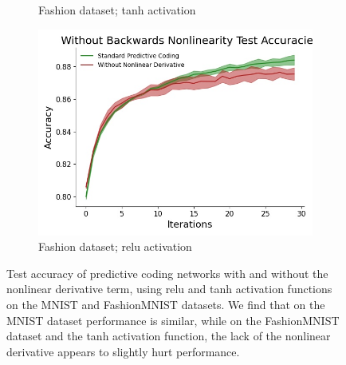 \begin{figure}[ht]
\begin{subfigure}[b]{0.5\linewidth}
 \caption{\small Fashion dataset; tanh activation} 
 \end{subfigure}%
 \begin{subfigure}[b]{0.5\linewidth}
 \centering
 \includegraphics[width=0.75\linewidth]{chapter_3_figures/fashion_relu_Without_Backwards_Nonlinearity_Test_Accuracies_prelim_2.jpg} 
 \caption{\small Fashion dataset; relu activation} 
 \end{subfigure} 
 \caption{Test accuracy of predictive coding networks with and without the nonlinear derivative term, using relu and tanh activation functions on the MNIST and FashionMNIST datasets. We find that on the MNIST dataset performance is similar, while on the FashionMNIST dataset and the tanh activation function, the lack of the nonlinear derivative appears to slightly hurt performance.}
\end{figure} 
 
